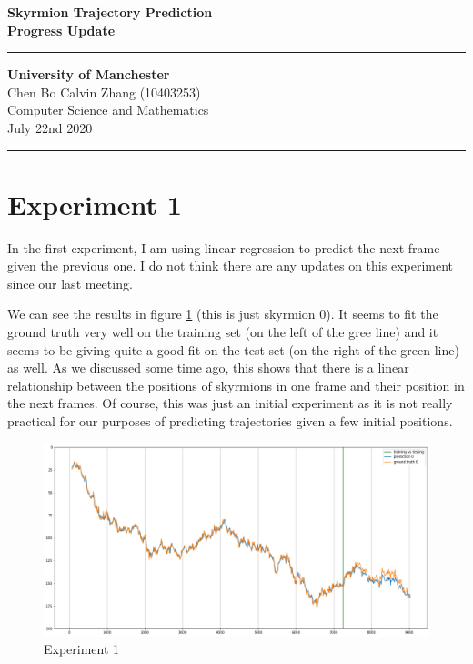 \documentclass[a4paper]{article}
\begin{document}
  \begin{titlepage}
    \begin{center}
      \vfill
      \textbf{\huge{Skyrmion Trajectory Prediction \\ \vspace{5pt} Progress Update}} \\
      \vfill
      \hrule
      \vspace{5pt}
      \textbf{\large{University of Manchester}} \\
      \large{Chen Bo Calvin Zhang (10403253)} \\
      \large{Computer Science and Mathematics} \\
      \large{July 22nd 2020} \\
      \vspace{5pt}
      \hrule
      \vfill
    \end{center}
  \end{titlepage} 
  
  \tableofcontents
  
  \newpage
  \section{Experiment 1}
  In the first experiment, I am using linear regression to predict the next frame given the previous one. I do not think there are any updates on this experiment since our last meeting.

We can see the results in figure \ref{fig:exp1} (this is just skyrmion 0). It seems to fit the ground truth very well on the training set (on the left of the gree line) and it seems to be giving quite a good fit on the test set (on the right of the green line) as well. As we discussed some time ago, this shows that there is a linear relationship between the positions of skyrmions in one frame and their position in the next frames. Of course, this was just an initial experiment as it is not really practical for our purposes of predicting trajectories given a few initial positions.

\begin{figure}[h]
  \centering
  \includegraphics[width=\textwidth]{exp 1}
  \caption{Experiment 1}
  \label{fig:exp1}
\end{figure}
\end{document}
